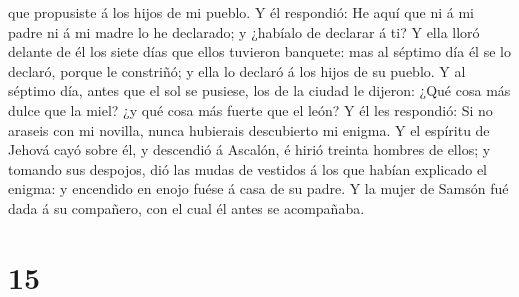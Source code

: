 que propusiste á los hijos de mi pueblo. Y él respondió: He aquí que ni
á mi padre ni á mi madre lo he declarado; y ¿habíalo de declarar á ti?
 Y ella lloró delante de él los siete días que ellos
tuvieron banquete: mas al séptimo día él se lo declaró, porque le
constriñó; y ella lo declaró á los hijos de su pueblo.  Y
al séptimo día, antes que el sol se pusiese, los de la ciudad le
dijeron: ¿Qué cosa más dulce que la miel? ¿y qué cosa más fuerte que el
león?  Y él les respondió: Si no araseis con mi novilla,
nunca hubierais descubierto mi enigma.  Y el espíritu de
Jehová cayó sobre él, y descendió á Ascalón, é hirió treinta hombres de
ellos; y tomando sus despojos, dió las mudas de vestidos á los que
habían explicado el enigma: y encendido en enojo fuése á casa de su
padre. Y la mujer de Samsón fué dada á su compañero, con el cual él
antes se acompañaba.

\hypertarget{section-14}{%
\section{15}\label{section-14}}

